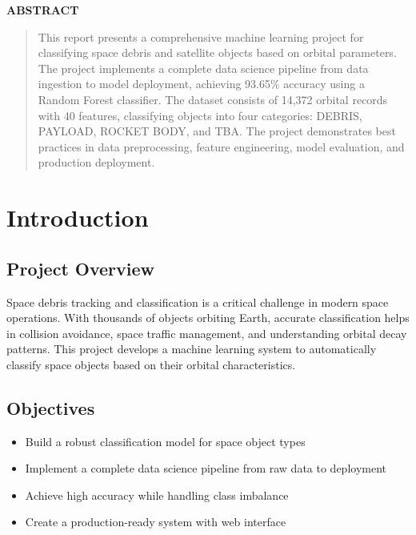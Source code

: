 \documentclass[12pt,a4paper]{article}
\renewenvironment{abstract}
{
    \begin{center}
    \vspace{0.5cm}
    {\large\textbf{\textcolor{primaryblue}{ABSTRACT}}\\[0.3cm]}
    \end{center}
    \begin{quotation}
    \noindent
    \itshape
}
{
    \end{quotation}
    \vspace{0.5cm}
}
\begin{document}
\pagestyle{fancy}
\setcounter{page}{2}

\begin{abstract}
This report presents a comprehensive machine learning project for classifying space debris and satellite objects based on orbital parameters. The project implements a complete data science pipeline from data ingestion to model deployment, achieving 93.65\% accuracy using a Random Forest classifier. The dataset consists of 14,372 orbital records with 40 features, classifying objects into four categories: DEBRIS, PAYLOAD, ROCKET BODY, and TBA. The project demonstrates best practices in data preprocessing, feature engineering, model evaluation, and production deployment.
\end{abstract}

\tableofcontents
\newpage

\section{Introduction}

\subsection{Project Overview}
Space debris tracking and classification is a critical challenge in modern space operations. With thousands of objects orbiting Earth, accurate classification helps in collision avoidance, space traffic management, and understanding orbital decay patterns. This project develops a machine learning system to automatically classify space objects based on their orbital characteristics.

\subsection{Objectives}
\begin{itemize}
    \item Build a robust classification model for space object types
    \item Implement a complete data science pipeline from raw data to deployment
    \item Achieve high accuracy while handling class imbalance
    \item Create a production-ready system with web interface
\end{itemize}
\end{document}
